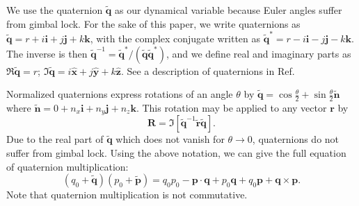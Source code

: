 \documentclass[linenumbers]{aastex631}
\newcommand{\unit}[1]{\hat{\mathbf{#1}}}
\newcommand{\brackets}[1]{\left[ #1 \right]}
\newcommand{\quat}[1]{\widetilde{\mathbf{#1}}}
\begin{document}
We use the quaternion $\quat q$ as our dynamical variable because Euler angles suffer from gimbal lock. For the sake of this paper, we write quaternions as $\quat q = r + i \mathbf i + j \mathbf j + k \mathbf k$, with the complex conjugate written as $\quat q^* = r - i \mathbf i - j \mathbf j - k \mathbf k$. The inverse is then $\quat q^{-1} = \quat q^* / (\quat q \quat q^*)$, and we define real and imaginary parts as $\Re \quat q = r$; $\Im \quat q = i \unit x + j \unit y + k \unit z$. See a description of quaternions in Ref.~\cite{2008arXiv0811.2889G}

Normalized quaternions express rotations of an angle $\theta$ by $\quat q = \cos\frac{\theta}{2} + \sin\frac{\theta}{2}\quat n$ where $\quat n = 0 + n_x \mathbf i + n_y \mathbf j + n_z\mathbf k$. This rotation may be applied to any vector $\mathbf r$ by
\begin{equation}
\mathbf R = \Im \brackets{\quat q^{-1} \quat r\quat q }.
\label{eqn:quat-rot}
\end{equation}
Due to the real part of $\quat q$ which does not vanish for $\theta \rightarrow 0$, quaternions do not suffer from gimbal lock. Using the above notation, we can give the full equation of quaternion multiplication:
\begin{equation}
(q_0 + \quat q) (p_0 + \quat p) = q_0 p_0 - \mathbf p \cdot \mathbf q + p_0 \mathbf q + q_0 \mathbf p + \mathbf q \times \mathbf p.
\label{eqn:quat-mult}
\end{equation}
Note that quaternion multiplication is not commutative.
\end{document}
